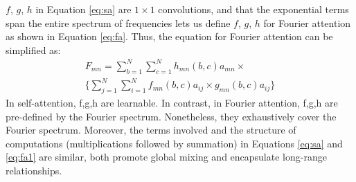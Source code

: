 \documentclass[runningheads]{llncs}
\begin{document}
$f$, $g$, $h$ in Equation \ref{eq:sa} are $1\times 1$ convolutions, and that the exponential terms span the entire spectrum of frequencies lets us define $f$, $g$, $h$ for Fourier attention as shown in Equation \ref{eq:fa}. Thus, the equation for Fourier attention can be simplified as:
\begin{align}
    F_{mn} = \sum_{b=1}^{N} \sum_{c=1}^{N} h_{mn}(b,c)a_{mn} \times \nonumber \\[-10pt] \{\sum_{j=1}^{N} \sum_{i=1}^{N} f_{mn}(b,c)a_{ij} \times g_{mn}(b,c)a_{ij}\}
    \label{eq:fa1}
\end{align}
In self-attention, f,g,h are learnable. In contrast, in Fourier attention, f,g,h are pre-defined by the Fourier spectrum. Nonetheless, they exhaustively cover the Fourier spectrum. Moreover, the terms involved and the structure of computations (multiplications followed by summation) in Equations \ref{eq:sa} and \ref{eq:fa1} are similar, both promote global mixing and encapsulate long-range relationships. 
\end{document}
